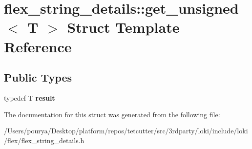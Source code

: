\hypertarget{structflex__string__details_1_1get__unsigned}{}\section{flex\+\_\+string\+\_\+details\+:\+:get\+\_\+unsigned$<$ T $>$ Struct Template Reference}
\label{structflex__string__details_1_1get__unsigned}
\subsection*{Public Types}
\begin{DoxyCompactItemize}
\item 
\hypertarget{structflex__string__details_1_1get__unsigned_af0c360ba68ff4b722b3654ce2d3e9316}{}typedef T {\bfseries result}\label{structflex__string__details_1_1get__unsigned_af0c360ba68ff4b722b3654ce2d3e9316}

\end{DoxyCompactItemize}


The documentation for this struct was generated from the following file\+:\begin{DoxyCompactItemize}
\item 
/\+Users/pourya/\+Desktop/platform/repos/tetcutter/src/3rdparty/loki/include/loki/flex/flex\+\_\+string\+\_\+details.\+h\end{DoxyCompactItemize}
